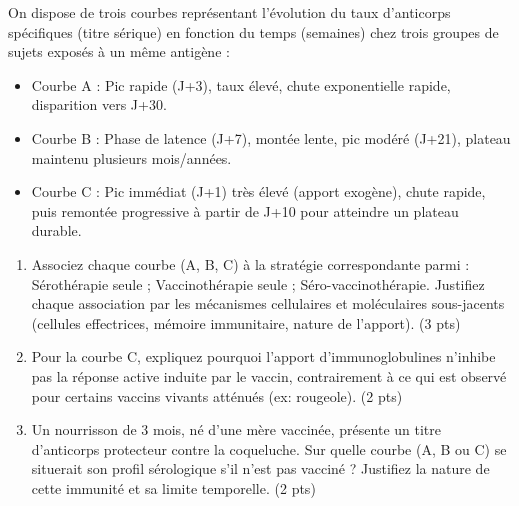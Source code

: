 \documentclass[11pt]{article}
\begin{document}
\begin{exercice}
On dispose de trois courbes représentant l'évolution du taux d'anticorps spécifiques (titre sérique) en fonction du temps (semaines) chez trois groupes de sujets exposés à un même antigène :
\begin{itemize}
    \item Courbe A : Pic rapide (J+3), taux élevé, chute exponentielle rapide, disparition vers J+30.
    \item Courbe B : Phase de latence (J+7), montée lente, pic modéré (J+21), plateau maintenu plusieurs mois/années.
    \item Courbe C : Pic immédiat (J+1) très élevé (apport exogène), chute rapide, puis remontée progressive à partir de J+10 pour atteindre un plateau durable.
\end{itemize}
\begin{enumerate}
    \item Associez chaque courbe (A, B, C) à la stratégie correspondante parmi : Sérothérapie seule ; Vaccinothérapie seule ; Séro-vaccinothérapie. Justifiez chaque association par les mécanismes cellulaires et moléculaires sous-jacents (cellules effectrices, mémoire immunitaire, nature de l'apport). (3 pts)
    \item Pour la courbe C, expliquez pourquoi l'apport d'immunoglobulines n'inhibe pas la réponse active induite par le vaccin, contrairement à ce qui est observé pour certains vaccins vivants atténués (ex: rougeole). (2 pts)
    \item Un nourrisson de 3 mois, né d'une mère vaccinée, présente un titre d'anticorps protecteur contre la coqueluche. Sur quelle courbe (A, B ou C) se situerait son profil sérologique s'il n'est pas vacciné ? Justifiez la nature de cette immunité et sa limite temporelle. (2 pts)
\end{enumerate}
\end{exercice}
\end{document}
